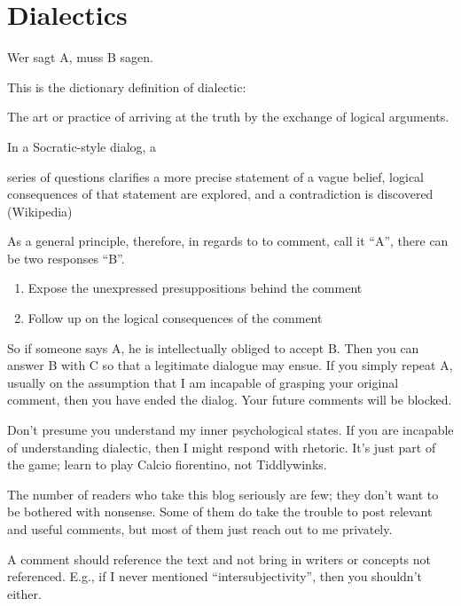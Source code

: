 \section{Dialectics}

\begin{quotex}
Wer sagt A, muss B sagen.
\end{quotex}


This is the dictionary definition of dialectic:

\begin{quotex}
The art or practice of arriving at the truth by the exchange of logical arguments.
\end{quotex}


In a Socratic-style dialog, a

\begin{quotex}
series of questions clarifies a more precise statement of a vague belief, logical consequences of that statement are explored, and a contradiction is discovered (Wikipedia)
\end{quotex}


As a general principle, therefore, in regards to to comment, call it ``A'', there can be two responses ``B''.

\begin{enumerate}


\item Expose the unexpressed presuppositions behind the comment

\item Follow up on the logical consequences of the comment
\end{enumerate}


So if someone says A, he is intellectually obliged to accept B. Then you can answer B with C so that a legitimate dialogue may ensue. If you simply repeat A, usually on the assumption that I am incapable of grasping your original comment, then you have ended the dialog. Your future comments will be blocked.

Don't presume you understand my inner psychological states. If you are incapable of understanding dialectic, then I might respond with rhetoric. It's just part of the game; learn to play Calcio fiorentino, not Tiddlywinks.

The number of readers who take this blog seriously are few; they don't want to be bothered with nonsense. Some of them do take the trouble to post relevant and useful comments, but most of them just reach out to me privately.

A comment should reference the text and not bring in writers or concepts not referenced. E.g., if I never mentioned ``intersubjectivity'', then you shouldn't either.

